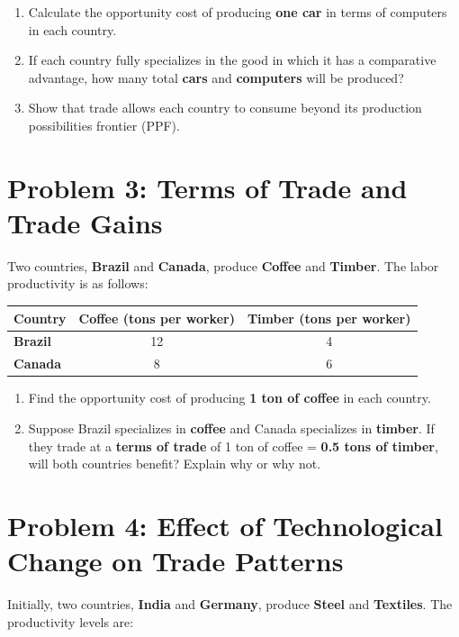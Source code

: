 \documentclass{article}
\begin{document}
\begin{enumerate}
    \item[(a)] Calculate the opportunity cost of producing \textbf{one car} in terms of computers in each country.
    \item[(b)] If each country fully specializes in the good in which it has a comparative advantage, how many total \textbf{cars} and \textbf{computers} will be produced?
    \item[(c)] Show that trade allows each country to consume beyond its production possibilities frontier (PPF).
\end{enumerate}

\section*{Problem 3: Terms of Trade and Trade Gains}
Two countries, \textbf{Brazil} and \textbf{Canada}, produce \textbf{Coffee} and \textbf{Timber}. The labor productivity is as follows:

\begin{table}[h]
    \centering
    \begin{tabular}{lcc}
        \toprule
        Country & Coffee (tons per worker) & Timber (tons per worker) \\
        \midrule
        \textbf{Brazil} & 12 & 4 \\
        \textbf{Canada} & 8 & 6 \\
        \bottomrule
    \end{tabular}
\end{table}

\begin{enumerate}
    \item[(a)] Find the opportunity cost of producing \textbf{1 ton of coffee} in each country.
    \item[(b)] Suppose Brazil specializes in \textbf{coffee} and Canada specializes in \textbf{timber}. If they trade at a \textbf{terms of trade} of 1 ton of coffee = \textbf{0.5 tons of timber}, will both countries benefit? Explain why or why not.
\end{enumerate}

\section*{Problem 4: Effect of Technological Change on Trade Patterns}
Initially, two countries, \textbf{India} and \textbf{Germany}, produce \textbf{Steel} and \textbf{Textiles}. The productivity levels are:
\end{document}
